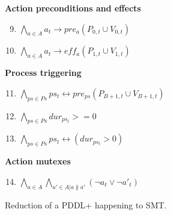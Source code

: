 \begin{figure}[thb!]
\textbf{Action preconditions and effects}
\begin{enumerate}[label=H\arabic*.]\setcounter{enumi}{8}
 \item $\bigwedge_{a \in A} a_t \rightarrow pre_{a}(P_{0,t} \cup V_{0,t})$
 \item $\bigwedge_{a \in A} a_t \rightarrow eff_{a}(P_{1,t} \cup V_{1,t})$
\end{enumerate}
\textbf{Process triggering}
\begin{enumerate}[label=H\arabic*.]\setcounter{enumi}{10}
 \item $\bigwedge_{ps\in Ps} ps_t \leftrightarrow pre_{ps}(P_{B+1,t} \cup V_{B+1,t})$
 \item $\bigwedge_{ps\in Ps} dur_{ps_t} >= 0$
 \item $\bigwedge_{ps\in Ps} ps_t \leftrightarrow (dur_{ps_t} > 0)$
\end{enumerate}
\textbf{Action mutexes}
\begin{enumerate}[label=H\arabic*.]\setcounter{enumi}{13}
 \item $\bigwedge_{a \in A} \bigwedge_{a' \in A | a \nparallel a'} (\neg a_t \vee \neg a'_t)$
\end{enumerate}
\caption{Reduction of a PDDL+ happening to SMT.}
\label{eq:state}
\end{figure}

\smallskip

